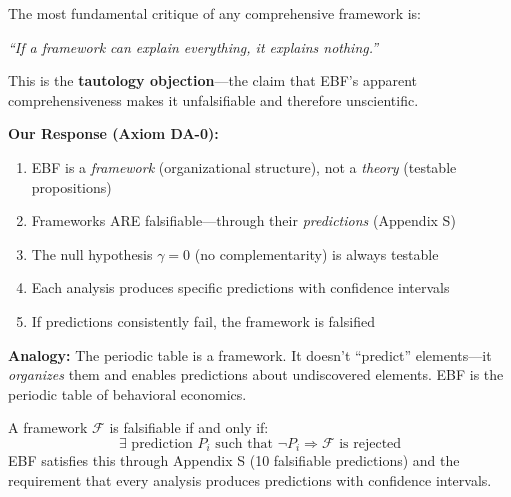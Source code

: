 \begin{tcolorbox}[colback=red!5!white, colframe=red!75!black,
    title=The Tautology Problem]

The most fundamental critique of any comprehensive framework is:

\begin{center}
\textit{``If a framework can explain everything, it explains nothing.''}
\end{center}

This is the \textbf{tautology objection}---the claim that EBF's apparent
comprehensiveness makes it unfalsifiable and therefore unscientific.

\textbf{Our Response (Axiom DA-0):}
\begin{enumerate}[nosep]
    \item EBF is a \textit{framework} (organizational structure), not a \textit{theory} (testable propositions)
    \item Frameworks ARE falsifiable---through their \textit{predictions} (Appendix S)
    \item The null hypothesis $\gamma = 0$ (no complementarity) is always testable
    \item Each analysis produces specific predictions with confidence intervals
    \item If predictions consistently fail, the framework is falsified
\end{enumerate}

\textbf{Analogy:} The periodic table is a framework. It doesn't ``predict'' elements---it
\textit{organizes} them and enables predictions about undiscovered elements. EBF is
the periodic table of behavioral economics.

\end{tcolorbox}

\begin{axiom}
A framework $\mathcal{F}$ is falsifiable if and only if:
\begin{equation}
\exists \text{ prediction } P_i \text{ such that } \neg P_i \Rightarrow \mathcal{F} \text{ is rejected}
\end{equation}
EBF satisfies this through Appendix S (10 falsifiable predictions) and the requirement
that every analysis produces predictions with confidence intervals.
\end{axiom}

